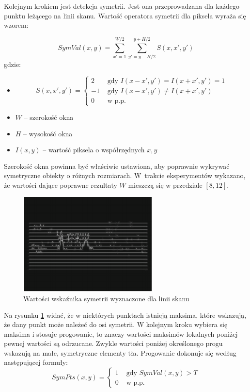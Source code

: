 Kolejnym krokiem jest detekcja symetrii. 
Jest ona przeprowadzana dla każdego punktu leżącego na linii skanu.
Wartość operatora symetrii dla piksela wyraża się wzorem:

\begin{equation}
\label{eq:sym_detect}
SymVal(x,y)=\sum_{x'=1}^{W/2}\sum_{y'=y-H/2}^{y+H/2}S(x, x', y')
\end{equation}
gdzie:
\begin{itemize}
\item
\begin{equation}
S(x,x',y')=\begin{cases}
2 & \text{ gdy } I(x-x',y')=I(x+x',y')=1 \\ 
-1 & \text{ gdy } I(x-x',y')\neq I(x+x',y') \\ 
0 & \text{ w p.p. }
\end{cases}
\end{equation}
\item $W$ -- szerokość okna
\item $H$ -- wysokość okna
\item $I(x,y)$ -- wartość piksela o współrzędnych $x,y$
\end{itemize}

Szerokość okna powinna być właściwie ustawiona, aby poprawnie wykrywać symetryczne obiekty o różnych rozmiarach. 
W~trakcie eksperymentów wykazano, że wartości dające poprawne rezultaty $W$ mieszczą się w przedziale $[8,12]$. %

\begin{figure}
  \centering
  \includegraphics[width=7cm]{img/tl_peaks.png}
  \caption{Wartości wskaźnika symetrii wyznaczone dla linii skanu\cite{T1}}
  \label{fig:car_scan_lines}
\end{figure}

Na rysunku \ref{fig:car_scan_lines} widać, że w niektórych punktach istnieją maksima, które wskazują, że dany punkt może należeć do osi symetrii. 
W kolejnym kroku wybiera się maksima i stosuje progowanie, to znaczy wartości maksimów lokalnych poniżej pewnej wartości są odrzucane. %
Zwykle wartości poniżej określonego progu wskazują na małe, symetryczne elementy tła. 
Progowanie dokonuje się według następującej formuły:
\begin{equation}
SymPts(x,y)=\begin{cases}
1 & \text{ gdy } SymVal(x,y)>T\\ 
0 & \text{ w p.p.}
\end{cases}
\end{equation}

